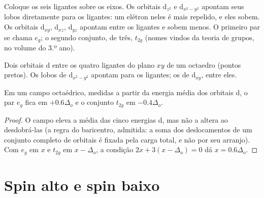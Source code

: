 Coloque os seis ligantes sobre os eixos. Os orbitais $\mathrm d_{z^2}$ e
$\mathrm d_{x^2-y^2}$ apontam seus lobos diretamente para os ligantes: um elétron
neles é mais repelido, e eles sobem. Os orbitais $\mathrm d_{xy}$, $\mathrm d_{xz}$,
$\mathrm d_{yz}$ apontam entre os ligantes e sobem menos. O primeiro par se
chama $e_g$; o segundo conjunto, de três, $t_{2g}$ (nomes vindos da teoria de
grupos, no volume do 3.º ano).

\begin{omfigure}

{\small Dois orbitais d entre os quatro ligantes do plano $xy$ de um octaedro
(pontos pretos). Os lobos de $\mathrm d_{x^2-y^2}$ apontam para os ligantes; os de
$\mathrm d_{xy}$, entre eles.}
\end{omfigure}

\begin{theorem}[Baricentro]\label{thm:b2:ligand-field:barycentre}
Em um campo octaédrico, medidas a partir da energia média dos orbitais d, o par
$e_g$ fica em $+0.6\Delta_o$ e o conjunto $t_{2g}$ em $-0.4\Delta_o$.
\end{theorem}

\begin{proof}
O campo eleva a média das cinco energias d, mas não a altera ao desdobrá-las
(a regra do baricentro, admitida: a soma dos deslocamentos de um conjunto
completo de orbitais é fixada pela carga total, e não por seu arranjo). Com
$e_g$ em $x$ e
$t_{2g}$ em $x - \Delta_o$, a condição $2x + 3(x - \Delta_o) = 0$ dá $x = 0.6\Delta_o$.
\end{proof}

\section{Spin alto e spin baixo}

